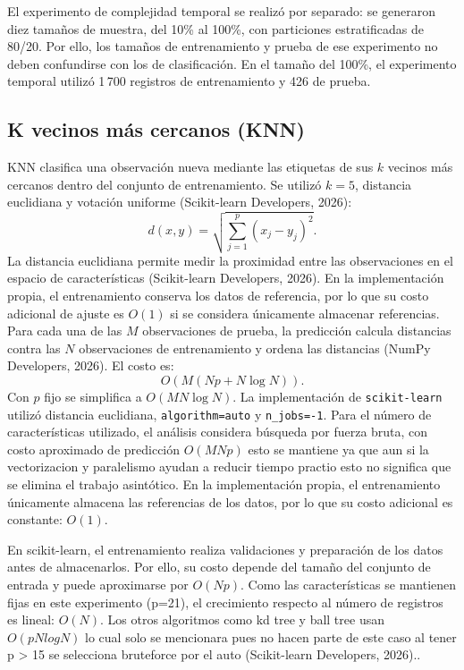 \documentclass[10pt,a4paper,twocolumn]{article}
\begin{document}
El experimento de complejidad temporal se realizó por separado: se generaron diez tamaños de muestra, del 10\% al 100\%, con particiones estratificadas de 80/20. Por ello, los tamaños de entrenamiento y prueba de ese experimento no deben confundirse con los de clasificación. En el tamaño del 100\%, el experimento temporal utilizó 1\,700 registros de entrenamiento y 426 de prueba.

\subsection{K vecinos más cercanos (KNN)}
KNN clasifica una observación nueva mediante las etiquetas de sus $k$ vecinos más cercanos dentro del conjunto de entrenamiento. Se utilizó $k=5$, distancia euclidiana y votación uniforme (Scikit-learn Developers, 2026):
\[
d(x,y)=\sqrt{\sum_{j=1}^{p}(x_j-y_j)^2}.
\]
La distancia euclidiana permite medir la proximidad entre las observaciones en el espacio de características (Scikit-learn Developers, 2026).
En la implementación propia, el entrenamiento conserva los datos de referencia, por lo que su costo adicional de ajuste es $O(1)$ si se considera únicamente almacenar referencias. Para cada una de las $M$ observaciones de prueba, la predicción calcula distancias contra las $N$ observaciones de entrenamiento y ordena las distancias (NumPy Developers, 2026). El costo es:
\[
O\left(M(Np+N\log N)\right).
\]
Con $p$ fijo se simplifica a $O(MN\log N)$. La implementación de \texttt{scikit-learn} utilizó distancia euclidiana, \texttt{algorithm=auto} y \texttt{n\_jobs=-1}. Para el número de características utilizado, el análisis considera búsqueda por fuerza bruta, con costo aproximado de predicción $O(MNp)$ esto se mantiene ya que aun si la vectorizacion y paralelismo ayudan a reducir tiempo practio esto no significa que se elimina el trabajo asintótico. En la implementación propia, el entrenamiento únicamente almacena las referencias de los datos, por lo que su costo adicional es constante: \(O(1)\).

En scikit-learn, el entrenamiento realiza validaciones y preparación de los datos antes de almacenarlos. Por ello, su costo depende del tamaño del conjunto de entrada y puede aproximarse por $O(Np) $. Como las características se mantienen fijas en este experimento (p=21), el crecimiento respecto al número de registros es lineal: $O(N) $. 
Los otros algoritmos como kd tree y ball tree usan $O(pNlogN)$ lo cual solo se mencionara pues no hacen parte de este caso al tener p > 15 se selecciona bruteforce por el auto (Scikit-learn Developers, 2026)..
\end{document}
